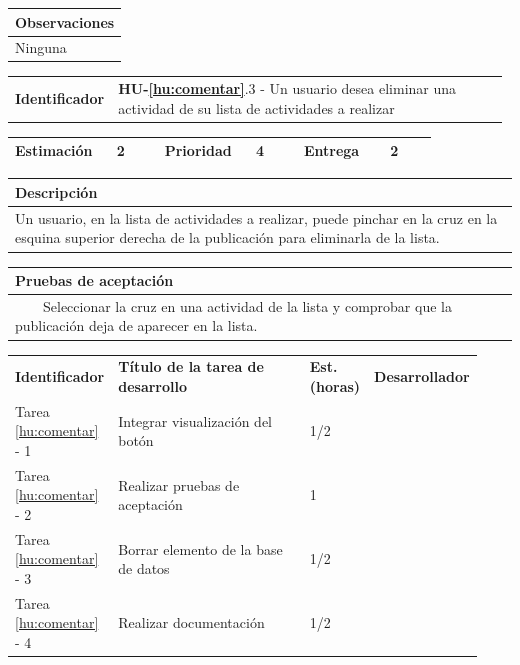 \documentclass[11pt]{article}
\newcommand{\tabitem}{~~\llap{\textbullet}~~}
\begin{document}
\vspace{-0.8cm}
\begin{longtable}{p{1.028\linewidth}}
  \textbf{Observaciones}\\
  \midrule
  Ninguna\\
  \bottomrule
\end{longtable}



\begin{longtable}{p{0.18\linewidth}|p{0.8\linewidth}}
  \rowcolor{LightCyan}
  \textbf{Identificador} & \textbf{HU-\ref{hu:comentar}}.3 - Un usuario desea eliminar una actividad de su lista de actividades a realizar \\  
\end{longtable}
\vspace{-0.8cm}
\begin{longtable}{p{0.18\linewidth}|p{0.1\linewidth}|p{0.18\linewidth}|p{0.1\linewidth}|p{0.18\linewidth}|p{0.1\linewidth}}
  \toprule
  \textbf{Estimación} & 2 & \textbf{Prioridad} & 4 & \textbf{Entrega} & 2 \\
  \bottomrule
\end{longtable}
\vspace{-0.8cm}
\begin{longtable}{p{1.028\linewidth}}
  \textbf{Descripción}\\
  \midrule Un usuario, en la lista de actividades a realizar, puede pinchar en la cruz en la esquina superior derecha de la publicación para eliminarla de la lista.\\
  \bottomrule
\end{longtable}
\vspace{-0.8cm}
\begin{longtable}{p{1.028\linewidth}}
  \textbf{Pruebas de aceptación}\\
  \midrule
  \tabitem Seleccionar la cruz en una actividad de la lista y comprobar que la publicación deja de aparecer en la lista.\\
\end{longtable}
\vspace{-0.8cm}
\begin{longtable}{p{0.18\linewidth}|p{0.48\linewidth}|p{0.1\linewidth}|p{0.17\linewidth}}
  \toprule
  \textbf{Identificador} & \textbf{Título de la tarea de desarrollo} & \textbf{Est. (horas)} & \textbf{Desarrollador} \\
  Tarea \ref{hu:comentar} - 1 & Integrar visualización del botón & 1/2 &\\
  Tarea \ref{hu:comentar} - 2 & Realizar pruebas de aceptación& 1 & \\
  Tarea \ref{hu:comentar} - 3 & Borrar elemento de la base de datos & 1/2 & \\
  Tarea \ref{hu:comentar} - 4 & Realizar documentación & 1/2 &  \\
  \bottomrule
\end{longtable}
\end{document}
